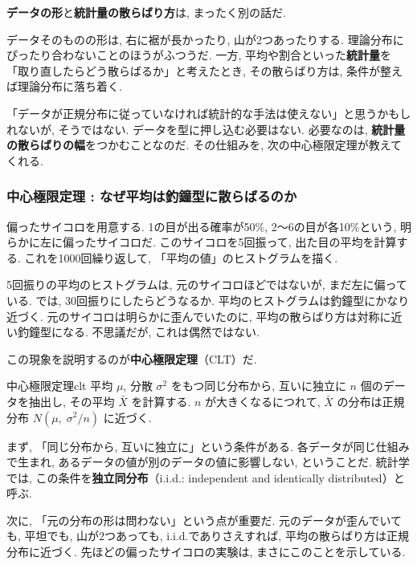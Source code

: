     \textbf{データの形}と\textbf{統計量の散らばり方}は, まったく別の話だ.

    データそのものの形は, 右に裾が長かったり, 山が2つあったりする.
    理論分布にぴったり合わないことのほうがふつうだ.
    一方, 平均や割合といった\textbf{統計量}を「取り直したらどう散らばるか」と考えたとき, その散らばり方は, 条件が整えば理論分布に落ち着く.

    「データが正規分布に従っていなければ統計的な手法は使えない」と思うかもしれないが, そうではない.
    データを型に押し込む必要はない.
    必要なのは, \textbf{統計量の散らばりの幅}をつかむことなのだ.
    その仕組みを, 次の中心極限定理が教えてくれる.

    \subsubsection{中心極限定理 : なぜ平均は釣鐘型に散らばるのか}

    偏ったサイコロを用意する.
    1の目が出る確率が50\%, 2〜6の目が各10\%という, 明らかに左に偏ったサイコロだ.
    このサイコロを5回振って, 出た目の平均を計算する.
    これを1000回繰り返して, 「平均の値」のヒストグラムを描く.


    5回振りの平均のヒストグラムは, 元のサイコロほどではないが, まだ左に偏っている.
    では, 30回振りにしたらどうなるか.
    平均のヒストグラムは釣鐘型にかなり近づく.
    元のサイコロは明らかに歪んでいたのに, 平均の散らばり方は対称に近い釣鐘型になる.
    不思議だが, これは偶然ではない.

    この現象を説明するのが\textbf{中心極限定理}（CLT）だ.

\begin{thm}{中心極限定理}{clt}
  平均 $\mu$, 分散 $\sigma^2$ をもつ同じ分布から, 互いに独立に $n$ 個のデータを抽出し, その平均 $\bar{X}$ を計算する.
  $n$ が大きくなるにつれて, $\bar{X}$ の分布は正規分布 $N\!\left(\mu,\; \sigma^2 / n\right)$ に近づく.
\end{thm}

    まず, 「同じ分布から, 互いに独立に」という条件がある.
    各データが同じ仕組みで生まれ, あるデータの値が別のデータの値に影響しない, ということだ.
    統計学では, この条件を\textbf{独立同分布}（i.i.d.: independent and identically distributed）と呼ぶ.

    次に, 「元の分布の形は問わない」という点が重要だ.
    元のデータが歪んでいても, 平坦でも, 山が2つあっても, i.i.d.でありさえすれば, 平均の散らばり方は正規分布に近づく.
    先ほどの偏ったサイコロの実験は, まさにこのことを示している.

